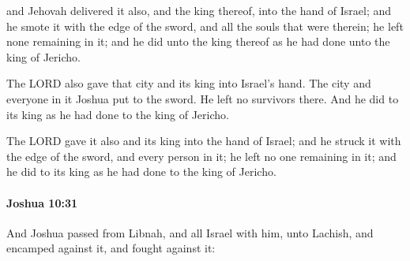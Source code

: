 			\begin{versebox}
					\item[BHS] 
					\item[ASV] and Jehovah delivered it also, and the king thereof, into the hand of Israel; and he smote it with the edge of the sword, and all the souls that were therein; he left none remaining in it; and he did unto the king thereof as he had done unto the king of Jericho.
					\item[NIV] The LORD also gave that city and its king into Israel’s hand. The city and everyone in it Joshua put to the sword. He left no survivors there. And he did to its king as he had done to the king of Jericho.
					\item[NRSV] The LORD gave it also and its king into the hand of Israel; and he struck it with the edge of the sword, and every person in it; he left no one remaining in it; and he did to its king as he had done to the king of Jericho.
			\end{versebox}

		\paragraph{Joshua 10:31} %
			\label{JOSHUA-10-31}

			And Joshua passed from Libnah, and all Israel with him, unto Lachish, and encamped against it, and fought against it:

